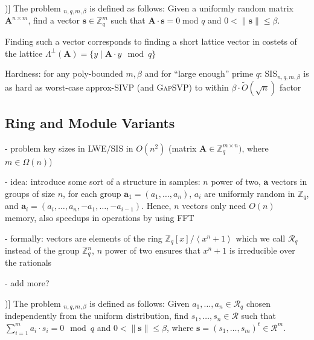 \documentclass[
  a4paper,  %
  twoside,  %
  bibliography=totoc,
  headsepline,
  cleardoublepage=empty,
  parskip=half,
  draft=false
]{scrbook}
\begin{document}
\begin{definition}[SIS Problem (Adapted from [\citealp{LS15}, Definition 3.1])]
  The problem $_{n, q, m, \beta}$ is defined as follows: Given a uniformly random matrix $\textbf{A}^{n\times m}$, find a vector $\textbf{s} \in \mathbb{Z}_q^m$ such that $\textbf{A} \cdot \textbf{s} = 0 \; \text{mod } q$ and $0 < \| \textbf{s}\| \leq \beta$.
\end{definition}

Finding such a vector corresponds to finding a short lattice vector in costets of the lattice $\Lambda^{\perp}(\textbf{A}) = \{ y \mid \textbf{A} \cdot y \mod q \}$ %

Hardness: for any poly-bounded $m, \beta$ and for ``large enough'' prime $q$: SIS$_{n, q, m, \beta}$ is as hard as worst-case approx-SIVP (and \textsc{GapSVP}) to within $\beta \cdot \tilde{O}(\sqrt{n})$ factor 

\subsection{Ring and Module Variants} 
- problem key sizes in LWE/SIS in $O(n^2)$ (matrix $\textbf{A} \in \mathbb{Z}_q^{m \times n})$, where $m \in \Omega(n)$)%

- idea: introduce some sort of a structure in samples: $n$ power of two, $\textbf{a}$ vectors in groups of size $n$, for each group $\textbf{a}_1 = (a_1, \ldots, a_n)$, $a_i$ are uniformly random in $\mathbb{Z}_q$, and $\textbf{a}_i = (a_i, \ldots, a_n, -a_1, \ldots, -a_{i-1})$. Hence, $n$ vectors only need $O(n)$ memory, also speedups in operations by using FFT %

- formally: vectors are elements of the ring $\mathbb{Z}_q\left[x\right] / \left\langle x^n + 1 \right\rangle$ which we call $\mathcal{R}_q$ instead of the group $\mathbb{Z}_q^n$, $n$ power of two ensures that $x^n + 1$ is irreducible over the rationals%

- add more? %

\begin{definition}[Ring-SIS Problem [\citealp{LS15}, Definition 3.3])]
  The problem $_{n, q, m, \beta}$ is defined as follows: Given $a_1, \ldots, a_n \in \mathcal{R}_q$ chosen independently from the uniform distribution, find $s_1, \ldots, s_n \in \mathcal{R}$ such that $\sum_{i=1}^m a_i \cdot s_i = 0 \mod q$ and $0 < \| \textbf{s}\| \leq \beta$, where $\textbf{s} = (s_1, \ldots, s_m)^t \in \mathcal{R}^m$.
\end{definition} %
\end{document}
